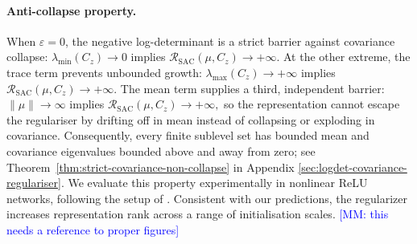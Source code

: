 \documentclass{article} %
\theoremstyle{remark}
\newcommand{\mm}[1]{\textcolor{blue}{[MM: #1]}}
\begin{document}
\paragraph{Anti-collapse property.}
When $\varepsilon=0$, the negative log-determinant is a strict barrier against covariance collapse: $\lambda_{\min}(C_z)\rightarrow0$ implies $\mathcal{R}_{\mathrm{SAC}}(\mu,C_z)\rightarrow+\infty.$
At the other extreme, the trace term prevents unbounded growth: $\lambda_{\max}(C_z)\rightarrow+\infty$ implies $\mathcal{R}_{\mathrm{SAC}}(\mu,C_z)\rightarrow+\infty.$ The mean term supplies a third, independent barrier: $\|\mu\|\rightarrow\infty$ implies $ \mathcal{R}_{\mathrm{SAC}}(\mu,C_z)\rightarrow+\infty,$ so the representation cannot escape the regulariser by drifting off in mean instead of collapsing or exploding in covariance. 
Consequently, every finite sublevel set has bounded mean and covariance eigenvalues bounded above and away from zero; see Theorem~\ref{thm:strict-covariance-non-collapse} in Appendix \ref{sec:logdet-covariance-regulariser}. We evaluate this property experimentally in nonlinear ReLU networks, following the setup of \cite{kunin_2024_get}. Consistent with our predictions, the regularizer increases representation rank across a range of initialisation scales. \mm{this needs a reference to proper figures}



\end{document}
